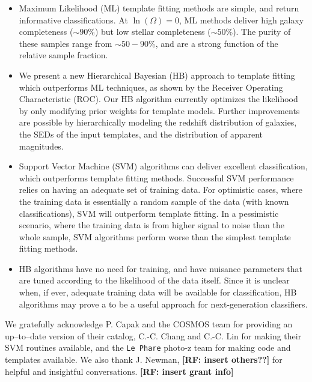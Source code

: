 \documentclass[12pt,preprint]{aastex}
\newcommand\rf[1]{{\bf [RF: #1]}}
\begin{document}
\begin{itemize}

\item Maximum Likelihood (ML) template fitting methods are simple, and return informative 
classifications.  At $\ln(\Omega)=0$, ML methods deliver high galaxy completeness 
($\sim90\%$) but low stellar completeness ($\sim50\%$).  The purity of these samples range 
from $\sim50-90\%$, and are a strong function of the relative sample fraction.

\item We present a new Hierarchical Bayesian (HB) approach to template fitting which 
outperforms ML techniques, as shown by the Receiver Operating Characteristic (ROC).  
Our HB algorithm currently optimizes the likelihood by only modifying prior weights for 
template models.  Further improvements are possible by hierarchically modeling the 
redshift distribution of galaxies, the SEDs of the input templates, and the distribution of 
apparent magnitudes.

\item Support Vector Machine (SVM) algorithms can deliver excellent classification, which 
outperforms template fitting methods.  Successful SVM performance relies on having an 
adequate set of training data.  For optimistic cases, where the training data is essentially a 
random sample of the data (with known classifications), SVM will outperform template fitting.  In 
a pessimistic scenario, where the training data is from higher signal to noise than the whole 
sample, SVM algorithms perform worse than the simplest template fitting methods.

\item HB algorithms have no need for training, and have nuisance parameters that are 
tuned according to the likelihood of the data itself.  Since it is unclear when, if ever, 
adequate training data will be available for classification, HB algorithms may prove a 
to be a useful approach for next-generation classifiers.

\end{itemize}

\acknowledgments

We gratefully acknowledge P. Capak and the COSMOS team for providing an up--to--date 
version of their catalog, C.-C. Chang and C.-C. Lin for making their SVM routines available, 
and the {\tt Le Phare} photo-z team for making code and templates available.  We also thank 
J. Newman, \rf{insert others??} for helpful and insightful conversations.  \rf{insert grant info}
\end{document}
